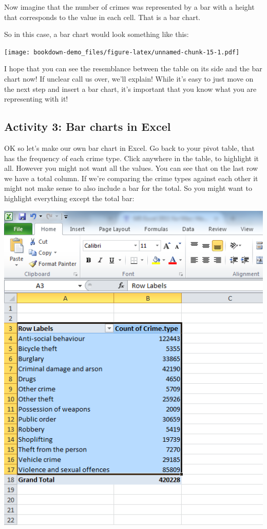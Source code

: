 \documentclass[]{book}
\theoremstyle{definition}
\theoremstyle{definition}
\theoremstyle{definition}
\theoremstyle{remark}
\begin{document}
Now imagine that the number of crimes was represented by a bar with a
height that corresponds to the value in each cell. That is a bar chart.

So in this case, a bar chart would look something like this:

\texttt{[image: bookdown-demo\_files/figure-latex/unnamed-chunk-15-1.pdf]}

I hope that you can see the resemblance between the table on its side
and the bar chart now! If unclear call us over, we'll explain! While
it's easy to just move on the next step and insert a bar chart, it's
important that you know what you are representing with it!

\hypertarget{activity-3-bar-charts-in-excel}{%
\subsection{Activity 3: Bar charts in
Excel}\label{activity-3-bar-charts-in-excel}}

OK so let's make our own bar chart in Excel. Go back to your pivot
table, that has the frequency of each crime type. Click anywhere in the
table, to highlight it all. However you might not want all the values.
You can see that on the last row we have a total column. If we're
comparing the crime types against each other it might not make sense to
also include a bar for the total. So you might want to highlight
everything except the total bar:

\includegraphics{imgs/crime_type_table.png}
\end{document}
